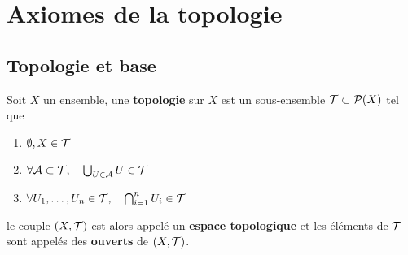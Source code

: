 \chapter{Axiomes de la topologie}

\section{Topologie et base}

\begin{definition} \label{def: Espace topologique}
	Soit $X$ un ensemble, une \textbf{topologie} sur $X$ est un sous-ensemble $\mathcal T \subset \mathcal P(X)$ tel que
	\begin{enumerate}
		\item[(T1)] \label{def: T1} $\emptyset, X \in \mathcal T$
		\item[(T2)] \label{def: T2} $\forall \mathcal A \subset \mathcal T, \quad \bigcup_{U \in \mathcal A} U \in \mathcal T$
		\item[(T3)] \label{def: T3} $\forall U_1, \ldots, U_n \in \mathcal T, \quad \bigcap_{i=1}^n U_i \in \mathcal T$
	\end{enumerate}
	le couple $(X, \mathcal T)$ est alors appelé un \textbf{espace topologique} et les éléments de $\mathcal T$ sont appelés des \textbf{ouverts} de $(X, \mathcal T)$.
\end{definition}

